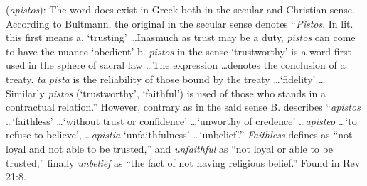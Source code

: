 \item[Unfaithful (to God),]

(\textit{apistos}):
The word does exist in Greek both in the secular and Christian sense. According to Bultmann, the original  in the secular sense denotes ``\emph{Pistos}. In lit. this first means  a. `trusting' \ldots Inasmuch as trust may be a duty, \emph{pistos} can come to have the nuance `obedient' b. \emph{pistos} in the sense `trustworthy' is a word first used in the sphere of sacral law \ldots The expression \ldots denotes the conclusion of a treaty. \emph{ta pista} is the reliability of those bound by the treaty \ldots `fidelity' \ldots Similarly \emph{pistos} (`trustworthy', `faithful') is used of those who stands in a contractual relation.''
However, contrary as in the said sense B. describes ``\emph{apistos} \ldots `faithless' \ldots `without trust or confidence' \ldots `unworthy of credence' \ldots \emph{apisteō} \ldots `to refuse to believe', \ldots \emph{apistia} `unfaithfulness' \ldots `unbelief'.''
\emph{Faithless} defines as ``not loyal and not able to be trusted,'' and \emph{unfaithful} as ``not loyal or able to be trusted,'' finally \emph{unbelief} as ``the fact of not having religious belief.''
Found in Rev 21:8.
